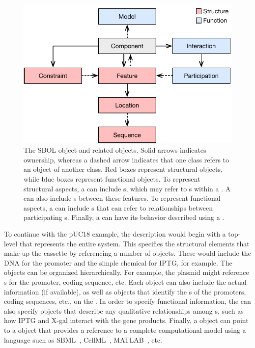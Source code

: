 \begin{figure}[ht]
\begin{center}
  \includegraphics[scale=0.85]{images/SBOL3-main-classes.pdf}
\caption{The SBOL  object and related objects.  
	Solid arrows indicates ownership, whereas a dashed arrow indicates that one class refers to an object of another class.  
	Red boxes represent structural objects, while blue boxes represent functional objects.  
	To represent structural aspects, a  can include s, which may refer to s within a . 
	A  can also include s between these features.  
	To represent functional aspects, a  can include s that can refer to relationships between participating s.  
	Finally, a  can have its behavior described using a .}
\label{images:overview1}
\end{center}
\end{figure}

To continue with the pUC18 example, the description would begin with a top-level  that represents the entire system.  
This  specifies the structural elements that make up the cassette by referencing a number of  objects. These would include the DNA  for the promoter and the simple chemical
 for IPTG, for example.  
The  objects can be organized hierarchically.  
For example, the plasmid  might reference s for the promoter, coding sequence, etc.  
Each  object can also include the actual  information (if available), as well as  objects that identify the s of the promoters, coding sequences, etc., on the .  
In order to specify functional information, the  can also specify  objects that describe any qualitative relationships among  s, such as how IPTG and X-gal interact with the gene products.  Finally, a  object can point to a  object that provides a reference to a complete computational model using a language such as SBML~\cite{SBML}, CellML~\cite{CellML}, MATLAB~\cite{matlab}, etc.

